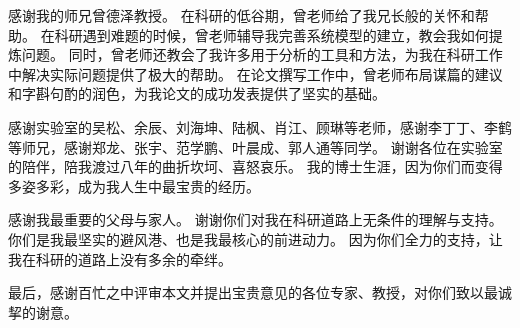 \documentclass[format=draft,language=chinese,degree=phd,table,usenames,dvipsnames]{hustthesis}
\begin{document}
\begin{ack}
感谢我的师兄曾德泽教授。
在科研的低谷期，曾老师给了我兄长般的关怀和帮助。
在科研遇到难题的时候，曾老师辅导我完善系统模型的建立，教会我如何提炼问题。
同时，曾老师还教会了我许多用于分析的工具和方法，为我在科研工作中解决实际问题提供了极大的帮助。
在论文撰写工作中，曾老师布局谋篇的建议和字斟句酌的润色，为我论文的成功发表提供了坚实的基础。


感谢实验室的吴松、余辰、刘海坤、陆枫、肖江、顾琳等老师，感谢李丁丁、李鹤等师兄，感谢郑龙、张宇、范学鹏、叶晨成、郭人通等同学。
谢谢各位在实验室的陪伴，陪我渡过八年的曲折坎坷、喜怒哀乐。
我的博士生涯，因为你们而变得多姿多彩，成为我人生中最宝贵的经历。

感谢我最重要的父母与家人。
谢谢你们对我在科研道路上无条件的理解与支持。
你们是我最坚实的避风港、也是我最核心的前进动力。
因为你们全力的支持，让我在科研的道路上没有多余的牵绊。

最后，感谢百忙之中评审本文并提出宝贵意见的各位专家、教授，对你们致以最诚挈的谢意。


\end{ack}



\appendix
\end{document}
